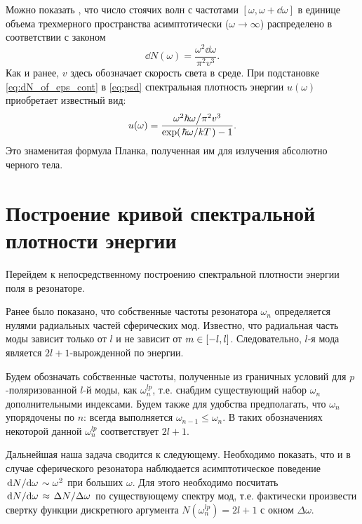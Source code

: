 \documentclass[12pt,a4paper]{article}
\begin{document}
        Можно показать \cite{sivuhin_opt}, что число стоячих волн с частотами $[\omega,\omega+\dd{\omega}]$ в единице объема трехмерного пространства асимптотически ($\omega \to \infty$) распределено в соответствии с законом
        \begin{equation}\label{eq:dN_of_eps_cont}
            \dd{N(\omega)} = \frac{\omega^2 \dd{\omega}}{\pi^2 v^3} .
        \end{equation}
        Как и ранее, $v$ здесь обозначает скорость света в среде. При подстановке \autoref{eq:dN_of_eps_cont} в \autoref{eq:psd} спектральная плотность энергии $u(\omega)$ приобретает известный вид:
        \begin{equation}
            u(\omega) = \frac{
                    \flatfrac{\omega^2 \hbar\omega}{\pi^2 v^3}
            }{\exp(\flatfrac{\hbar\omega}{kT}) - 1} .
        \end{equation}
        Это знаменитая формула Планка, полученная им для излучения абсолютно черного тела.


    \section{Построение кривой спектральной плотности энергии}

        Перейдем к непосредственному построению спектральной плотности энергии поля в резонаторе.

        Ранее было показано, что собственные частоты резонатора $\omega_n$ определяется нулями радиальных частей сферических мод. Известно, что радиальная часть моды зависит только от $l$ и не зависит от $m \in \qty[-l,l]$. Следовательно, $l$-я мода является $2l + 1$-вырожденной по энергии.

        Будем обозначать собственные частоты, полученные из граничных условий для $p$-поляризованной $l$-й моды, как $\omega^{lp}_n$, т.е. снабдим существующий набор $\omega_n$ дополнительными индексами. Будем также для удобства предполагать, что $\omega_n$ упорядочены по $n$: всегда выполняется $\omega_{n-1} \le \omega_n$. В таких обозначениях некоторой данной $\omega^{lp}_n$ соответствует $2l + 1$.

        Дальнейшая наша задача сводится к следующему. Необходимо показать, что и в случае сферического резонатора наблюдается асимптотическое поведение $\dv*{N}{\omega} \sim \omega^2$ при больших $\omega$. Для этого необходимо посчитать $\dv*{N}{\omega} \approx \flatfrac{\Delta N}{\Delta \omega}$ по существующему спектру мод, т.е. фактически произвести свертку функции дискретного аргумента $N(\omega^{lp}_n) = 2l + 1$ с окном $\Delta \omega$.
\end{document}
